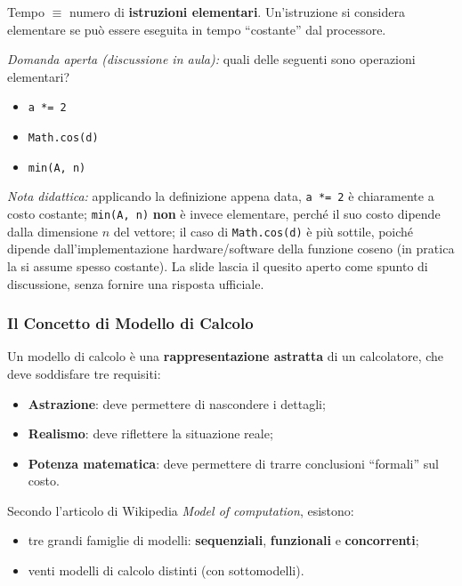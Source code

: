 \documentclass[12pt, a4paper]{article}
\begin{document}
\begin{tcolorbox}[colback=lightergray!10, colframe=tocsec, title=\textbf{Definizione: Tempo}]
Tempo $\equiv$ numero di \textbf{istruzioni elementari}. Un'istruzione si considera elementare se può essere eseguita in tempo ``costante'' dal processore.
\end{tcolorbox}

\textit{Domanda aperta (discussione in aula):} quali delle seguenti sono operazioni elementari?
\begin{itemize}
    \item \texttt{a *= 2}
    \item \texttt{Math.cos(d)}
    \item \texttt{min(A, n)}
\end{itemize}
\textit{Nota didattica:} applicando la definizione appena data, \texttt{a *= 2} è chiaramente a costo costante; \texttt{min(A, n)} \textbf{non} è invece elementare, perché il suo costo dipende dalla dimensione $n$ del vettore; il caso di \texttt{Math.cos(d)} è più sottile, poiché dipende dall'implementazione hardware/software della funzione coseno (in pratica la si assume spesso costante). La slide lascia il quesito aperto come spunto di discussione, senza fornire una risposta ufficiale.

\subsubsection{Il Concetto di Modello di Calcolo}

\begin{tcolorbox}[colback=lightergray!10, colframe=tocsec, title=\textbf{Definizione: Modello di Calcolo}]
\label{def:modello-calcolo}
Un modello di calcolo è una \textbf{rappresentazione astratta} di un calcolatore, che deve soddisfare tre requisiti:
\begin{itemize}
    \item \textcolor{red!70!black}{\textbf{Astrazione}}: deve permettere di nascondere i dettagli;
    \item \textcolor{red!70!black}{\textbf{Realismo}}: deve riflettere la situazione reale;
    \item \textcolor{red!70!black}{\textbf{Potenza matematica}}: deve permettere di trarre conclusioni ``formali'' sul costo.
\end{itemize}
\end{tcolorbox}

Secondo l'articolo di Wikipedia \textit{Model of computation}, esistono:
\begin{itemize}
    \item tre grandi famiglie di modelli: \textbf{sequenziali}, \textbf{funzionali} e \textbf{concorrenti};
    \item venti modelli di calcolo distinti (con sottomodelli).
\end{itemize}
\end{document}
